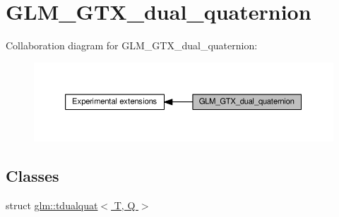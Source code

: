 \hypertarget{group__gtx__dual__quaternion}{}\section{G\+L\+M\+\_\+\+G\+T\+X\+\_\+dual\+\_\+quaternion}
\label{group__gtx__dual__quaternion}
Collaboration diagram for G\+L\+M\+\_\+\+G\+T\+X\+\_\+dual\+\_\+quaternion\+:
\nopagebreak
\begin{figure}[H]
\begin{center}
\leavevmode
\includegraphics[width=350pt]{d7/d1c/group__gtx__dual__quaternion}
\end{center}
\end{figure}
\subsection*{Classes}
\begin{DoxyCompactItemize}
\item 
struct \hyperlink{structglm_1_1tdualquat}{glm\+::tdualquat$<$ T, Q $>$}
\end{DoxyCompactItemize}
